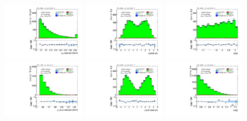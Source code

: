 \clearpage

\begin{figure}[!htpb]
  \includegraphics[width=0.30\textwidth]{figures/analysis/vbf-QCDCR/jet-1-pt}
  \includegraphics[width=0.30\textwidth]{figures/analysis/vbf-QCDCR/jet-1-eta}
  \includegraphics[width=0.30\textwidth]{figures/analysis/vbf-QCDCR/jets-dphi} \\
  \includegraphics[width=0.30\textwidth]{figures/analysis/vbf-QCDCR/jet-2-pt}
  \includegraphics[width=0.30\textwidth]{figures/analysis/vbf-QCDCR/jet-2-eta}
  \includegraphics[width=0.30\textwidth]{figures/analysis/vbf-QCDCR/jets-deta} \\

\end{figure}
